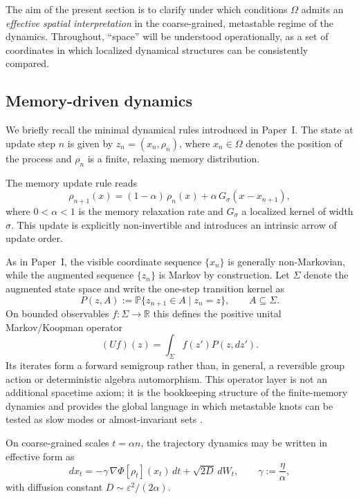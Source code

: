 \documentclass[reprint,amsmath,amssymb,aps,prl,nofootinbib,floatfix]{revtex4-2}
\begin{document}
The aim of the present section is to clarify under which conditions $\Omega$ admits an \emph{effective spatial interpretation} in the coarse-grained, metastable regime of the dynamics. 
Throughout, ``space'' will be understood operationally, as a set of coordinates in which localized dynamical structures can be consistently compared.

\subsection{Memory-driven dynamics}
We briefly recall the minimal dynamical rules introduced in Paper~I.
The state at update step $n$ is given by $z_n = (x_n,\rho_n)$, where
$x_n \in \Omega$ denotes the position of the process and $\rho_n$ is a
finite, relaxing memory distribution.

The memory update rule reads
\begin{equation}
\rho_{n+1}(x)
= (1-\alpha)\,\rho_n(x)
+ \alpha\,G_\sigma(x-x_{n+1}),  \label{eq:memory_update}
\end{equation}
where $0<\alpha<1$ is the memory relaxation rate and $G_\sigma$ a localized kernel of width $\sigma$.
This update is explicitly non-invertible and introduces an intrinsic arrow of update order.

As in Paper~I, the visible coordinate sequence $\{x_n\}$ is generally non-Markovian, while the augmented sequence $\{z_n\}$ is Markov by construction.
Let $\Sigma$ denote the augmented state space and write the one-step transition kernel as
\begin{equation}
P(z,A):=\mathbb{P}\{z_{n+1}\in A\mid z_n=z\},
\qquad A\subseteq\Sigma .
\end{equation}
On bounded observables $f:\Sigma\to\mathbb{R}$ this defines the positive unital Markov/Koopman operator
\begin{equation}
(Uf)(z)=\int_\Sigma f(z')P(z,dz').
\end{equation}
Its iterates form a forward semigroup rather than, in general, a reversible group action or deterministic algebra automorphism.
This operator layer is not an additional spacetime axiom; it is the bookkeeping structure of the finite-memory dynamics and provides the global language in which metastable knots can be tested as slow modes or almost-invariant sets \cite{NoeNuske2013,FroylandLloydSantitissadeekorn2010,WilliamsKevrekidisRowley2015,KlusEtAl2018,Parzygnat2017,Fritz2020}.

On coarse-grained scales $t=\alpha n$, the trajectory dynamics may be written in effective form as \cite{Oksendal2003}
\begin{equation}
dx_t
= -\gamma\,\nabla\Phi[\rho_t](x_t)\,dt
+ \sqrt{2D}\,dW_t, \qquad \gamma:=\frac{\eta}{\alpha}, \label{eq:effective_SDE}
\end{equation}
with diffusion constant $D\sim\varepsilon^2/(2\alpha)$.
\end{document}
